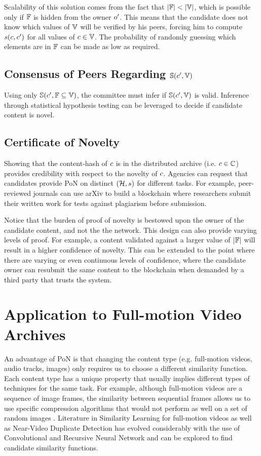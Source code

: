 \documentclass[conference]{IEEEtran}
\begin{document}
Scalability of this solution comes from the fact that $\vert{\mathbb{F}}\vert < \vert{\mathbb{V}}\vert$, which is possible only if ${\mathbb{F}}$ is hidden from the owner ${o}^\prime$. This means that the candidate does not know which values of ${\mathbb{V}}$ will be verified by his peers, forcing him to compute ${s}({c},{c}^\prime)$ for all values of ${c} \in {\mathbb{V}}$. The probability of randomly guessing which elements are in ${\mathbb{F}}$ can be made as low as required.

\subsection{Consensus of Peers Regarding ${\mathbb{S}}({c}^\prime, {\mathbb{V}})$}
Using only ${\mathbb{S}}({c}^\prime, {\mathbb{F}} \subseteq {\mathbb{V}})$, the committee must infer if ${\mathbb{S}}({c}^\prime, {\mathbb{V}})$ is valid. Inference through statistical hypothesis testing \cite{newey1994large} can be leveraged to decide if candidate content is novel.

\subsection{Certificate of Novelty}
Showing that the content-hash of ${c}$ is in the distributed archive (i.e. ${c} \in {{\mathbb{C}}}$) provides credibility with respect to the novelty of ${c}$. Agencies can request that candidates provide PoN on distinct $(\mathcal{H}, {s})$ for different tasks. For example, peer-reviewed journals can use arXiv to build a blockchain where researchers submit their written work for tests against plagiarism before submission.

Notice that the burden of proof of novelty is bestowed upon the owner of the candidate content, and not the the network. This design can also provide varying levels of proof. For example, a content validated against a larger value of $\vert{\mathbb{F}}\vert$ will result in a higher confidence of novelty. This can be extended to the point where there are varying or even continuous levels of confidence, where the candidate owner can resubmit the same content to the blockchain when demanded by a third party that trusts the system.


\section{Application to Full-motion Video Archives}
An advantage of PoN is that changing the content type (e.g. full-motion videos, audio tracks, images) only requires us to choose a different similarity function. Each content type has a unique property that usually implies different types of techniques for the same task. For example, although full-motion videos are a sequence of image frames, the similarity between sequential frames allows us to use specific compression algorithms that would not perform as well on a set of random images \cite{le1991mpeg}. Literature in Similarity Learning for full-motion videos as well as Near-Video Duplicate Detection \cite{li2019fast} has evolved considerably with the use of Convolutional and Recursive Neural Network \cite{saadatpanah2019adversarial} and can be explored to find candidate similarity functions.
\end{document}
